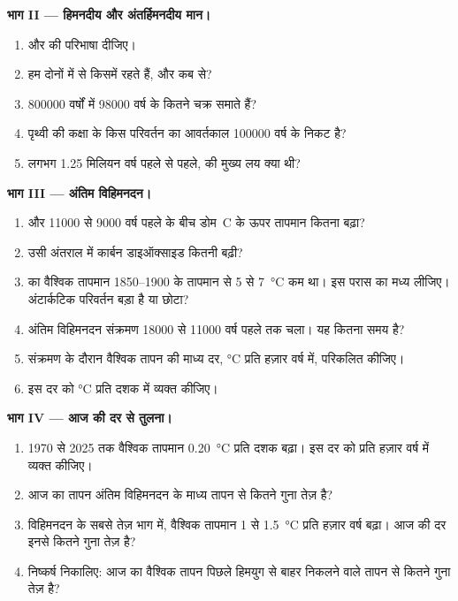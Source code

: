 \begin{problem}[{सप्ताहांत समस्या --- अंटार्कटिक बर्फ़ के 800 000 वर्ष}]
\medskip
\noindent\textbf{भाग II --- हिमनदीय और अंतर्हिमनदीय मान।}
\begin{enumerate}[resume]
  \item {} और  की परिभाषा दीजिए।
  \item हम दोनों में से किसमें रहते हैं, और कब से?
  \item \num{800000} वर्षों में \num{98000} वर्ष के कितने चक्र समाते हैं?
  \item पृथ्वी की कक्षा के किस परिवर्तन का आवर्तकाल
        \num{100000} वर्ष के निकट है?
  \item लगभग 1.25 मिलियन वर्ष पहले से पहले,  की मुख्य लय
        क्या थी?
\end{enumerate}

\medskip
\noindent\textbf{भाग III --- अंतिम विहिमनदन।}
\begin{enumerate}[resume]
  \item {} और \num{11000} से \num{9000} वर्ष पहले के बीच
        डोम~C के ऊपर तापमान कितना बढ़ा?
  \item उसी अंतराल में कार्बन डाइऑक्साइड कितनी बढ़ी?
  \item {} का वैश्विक तापमान 1850--1900 के तापमान से 5 से
        \qty{7}{\degreeCelsius} कम था। इस परास का मध्य
        लीजिए। अंटार्कटिक परिवर्तन बड़ा है या छोटा?
  \item अंतिम विहिमनदन संक्रमण \num{18000} से
        \num{11000} वर्ष पहले तक चला। यह कितना समय है?
  \item संक्रमण के दौरान वैश्विक तापन की माध्य दर,
        \unit{\degreeCelsius} प्रति हज़ार वर्ष में, परिकलित कीजिए।
  \item इस दर को \unit{\degreeCelsius} प्रति दशक में व्यक्त कीजिए।
\end{enumerate}

\medskip
\noindent\textbf{भाग IV --- आज की दर से तुलना।}
\begin{enumerate}[resume]
  \item 1970 से 2025 तक वैश्विक तापमान
        \qty{0.20}{\degreeCelsius} प्रति दशक बढ़ा। इस दर को प्रति
        हज़ार वर्ष में व्यक्त कीजिए।
  \item आज का तापन अंतिम विहिमनदन के माध्य तापन से कितने गुना
        तेज़ है?
  \item विहिमनदन के सबसे तेज़ भाग में, वैश्विक तापमान
        1 से \qty{1.5}{\degreeCelsius} प्रति हज़ार वर्ष बढ़ा। आज की दर
        इनसे कितने गुना तेज़ है?
  \item निष्कर्ष निकालिए: आज का वैश्विक तापन पिछले हिमयुग से बाहर निकलने वाले तापन से
        कितने गुना तेज़ है?
\end{enumerate}
\end{problem}
